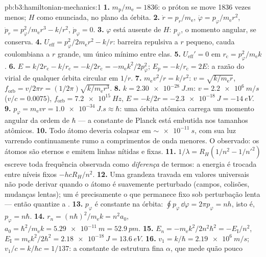 \begin{solution}{pb:b3:hamiltonian-mechanics:1}
\textbf{1.} $m_{\text{p}}/m_{\text{e}} = 1836$: o próton se move 1836
vezes menos; $H$ como enunciada, no plano da órbita.
\textbf{2.} $\dot r = p_r/m_{\text{e}}$, $\dot\varphi =
p_\varphi/m_{\text{e}}r^2$, $\dot p_r = p_\varphi^2/m_{\text{e}}r^3 -
k/r^2$, $\dot p_\varphi = 0$.
\textbf{3.} $\varphi$ está ausente de $H$: $p_\varphi$, o momento
angular, se conserva.
\textbf{4.} $U_{\text{eff}} = p_\varphi^2/2m_{\text{e}}r^2 - k/r$:
barreira repulsiva a $r$ pequeno, cauda coulombiana a $r$ grande, um
único mínimo entre elas.
\textbf{5.} $U_{\text{eff}}' = 0$ em $r_{\text{c}} =
p_\varphi^2/m_{\text{e}}k$.
\textbf{6.} $E = k/2r_{\text{c}} - k/r_{\text{c}} = -k/2r_{\text{c}} =
-m_{\text{e}}k^2/2p_\varphi^2$; $E_p = -k/r_{\text{c}} = 2E$: a razão
do virial de qualquer órbita circular em $1/r$.
\textbf{7.} $m_{\text{e}}v^2/r = k/r^2$: $v = \sqrt{k/m_{\text{e}}r}$,
$f_{\text{orb}} = v/2\pi r = (1/2\pi)\sqrt{k/m_{\text{e}}r^3}$.
\textbf{8.} $k = \qty{2.30e-28}{J.m}$: $v = \qty{2.2e6}{m/s}$ ($v/c =
0.0075$), $f_{\text{orb}} = \qty{7.2e15}{Hz}$, $E = -k/2r =
\qty{-2.3e-18}{J} = \qty{-14}{eV}$.
\textbf{9.} $p_\varphi = m_{\text{e}}vr = \qty{1.0e-34}{J.s} \approx
\hbar$: uma órbita atômica carrega um momento angular da ordem de
$\hbar$ --- a constante de Planck está embutida nos tamanhos atômicos.
\textbf{10.} Todo átomo deveria colapsar em $\sim\qty{e-11}{s}$, com
sua luz varrendo continuamente rumo a comprimentos de onda menores. O
observado: os átomos são eternos e emitem linhas nítidas e fixas.
\textbf{11.} $1/\lambda = R_H(1/n^2 - 1/n'^2)$ escreve toda frequência
observada como \emph{diferença} de termos: a energia é trocada entre
níveis fixos $-hcR_H/n^2$.
\textbf{12.} Uma grandeza travada em valores universais não pode
derivar quando o átomo é suavemente perturbado (campos, colisões,
mudanças lentas); um  é precisamente o que
permanece fixo sob perturbação lenta --- então quantize a .
\textbf{13.} $p_\varphi$ é constante na órbita: $\oint
p_\varphi\,\dd\varphi = 2\pi p_\varphi = nh$, isto é, $p_\varphi =
n\hbar$.
\textbf{14.} $r_n = (n\hbar)^2/m_{\text{e}}k = n^2a_0$, $a_0 =
\hbar^2/m_{\text{e}}k = \qty{5.29e-11}{m} = \qty{52.9}{pm}$.
\textbf{15.} $E_n = -m_{\text{e}}k^2/2n^2\hbar^2 = -E_{\text{I}}/n^2$,
$E_{\text{I}} = m_{\text{e}}k^2/2\hbar^2 = \qty{2.18e-18}{J} =
\qty{13.6}{eV}$.
\textbf{16.} $v_1 = k/\hbar = \qty{2.19e6}{m/s}$; $v_1/c = k/\hbar c =
1/137$: a constante de estrutura fina $\alpha$, que mede quão pouco

\end{solution}
